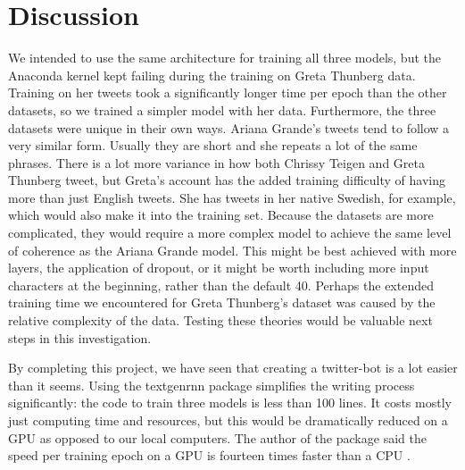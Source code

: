 \documentclass[%
 reprint,
 amsmath,amssymb,
 aps,
]{revtex4-2}
\begin{document}
\section{Discussion}

We intended to use the same architecture for training all three models, but the Anaconda kernel kept failing during the training on Greta Thunberg data. Training on her tweets took a significantly longer time per epoch than the other datasets, so we trained a simpler model with her data. Furthermore, the three datasets were unique in their own ways. Ariana Grande's tweets tend to follow a very similar form. Usually they are short and she repeats a lot of the same phrases. There is a lot more variance in how both Chrissy Teigen and Greta Thunberg tweet, but Greta's account has the added training difficulty of having more than just English tweets. She has tweets in her native Swedish, for example, which would also make it into the training set. Because the datasets are more complicated, they would require a more complex model to achieve the same level of coherence as the Ariana Grande model. This might be best achieved with more layers, the application of dropout, or it might be worth including more input characters at the beginning, rather than the default 40. Perhaps the extended training time we encountered for Greta Thunberg's dataset was caused by the relative complexity of the data. Testing these theories would be valuable next steps in this investigation.

By completing this project, we have seen that creating a twitter-bot is a lot easier than it seems. Using the textgenrnn package simplifies the writing process significantly: the code to train three models is less than 100 lines. It costs mostly just computing time and resources, but this would be dramatically reduced on a GPU as opposed to our local computers. The author of the package said the speed per training epoch on a GPU is fourteen times faster than a CPU \cite{maxWoolfBlog}. 

\end{document}
